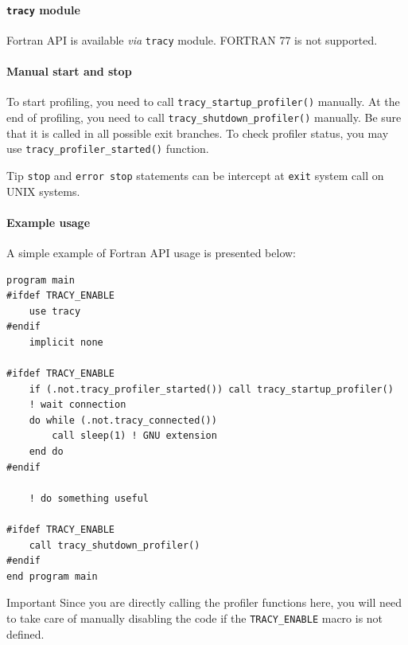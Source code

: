 \documentclass[hidelinks,titlepage,a4paper,twoside]{article}
\begin{document}
\paragraph{\texttt{tracy} module}

Fortran API is available \textit{via} \texttt{tracy} module. FORTRAN 77 is not supported.

\paragraph{Manual start and stop}

To start profiling, you need to call \texttt{tracy\_startup\_profiler()} manually.
At the end of profiling, you need to call \texttt{tracy\_shutdown\_profiler()} manually.
Be sure that it is called in all possible exit branches.
To check profiler status, you may use \texttt{tracy\_profiler\_started()} function.

\begin{bclogo}[
noborder=true,
couleur=black!5,
logo=\bcbombe
]{Tip}
\texttt{stop} and \texttt{error stop} statements can be intercept at \texttt{exit} system call on UNIX systems.
\end{bclogo}

\paragraph{Example usage}

A simple example of Fortran API usage is presented below:

\begin{lstlisting}
program main
#ifdef TRACY_ENABLE
    use tracy
#endif
    implicit none

#ifdef TRACY_ENABLE
    if (.not.tracy_profiler_started()) call tracy_startup_profiler()
    ! wait connection
    do while (.not.tracy_connected())
        call sleep(1) ! GNU extension
    end do
#endif

    ! do something useful

#ifdef TRACY_ENABLE
    call tracy_shutdown_profiler()
#endif
end program main
\end{lstlisting}

\begin{bclogo}[
noborder=true,
couleur=black!5,
logo=\bcbombe
]{Important}
Since you are directly calling the profiler functions here, you will need to take care of manually disabling the code if the \texttt{TRACY\_ENABLE} macro is not defined.
\end{bclogo}
\end{document}
